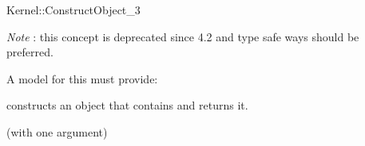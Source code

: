 \begin{ccRefFunctionObjectConcept}{Kernel::ConstructObject_3}
\begin{ccDeprecated}
{\em Note} : this concept is deprecated since 4.2 and type safe ways should be preferred. 

A model for this must provide:


{constructs an object that contains  and returns it.}

\ccRefines
{} (with one argument)

\ccSeeAlso
 \\
 \\
 \\
 \\
 \\
\end{ccDeprecated}
\end{ccRefFunctionObjectConcept}

